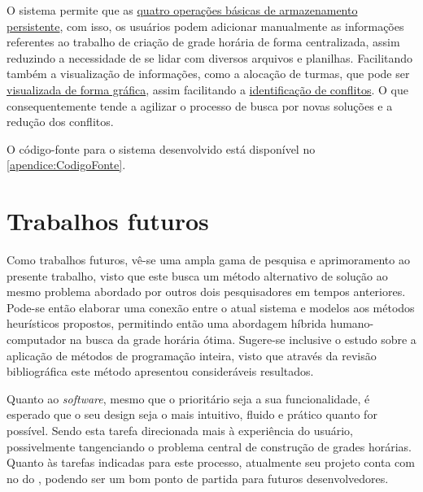 O sistema permite que as \hyperref[sssec:Funcionalidades Iniciais]{quatro operações básicas de armazenamento persistente}, com isso, os usuários podem adicionar manualmente as informações referentes ao trabalho de criação de grade horária de forma centralizada, assim reduzindo a necessidade de se lidar com diversos arquivos e planilhas. Facilitando também a visualização de informações, como a alocação de turmas, que pode ser \hyperref[fig:pagina_multiFiltros]{visualizada de forma gráfica}, assim facilitando a \hyperref[sec:conflitos]{identificação de conflitos}. O que consequentemente tende a agilizar o processo de busca por novas soluções e a redução dos conflitos.

O código-fonte para o sistema desenvolvido está disponível no \autoref{apendice:CodigoFonte}.

\section{Trabalhos futuros} %

Como trabalhos futuros, vê-se uma ampla gama de pesquisa e aprimoramento ao presente trabalho, visto que este busca um método alternativo de solução ao mesmo problema abordado por outros dois pesquisadores em tempos anteriores. Pode-se então elaborar uma conexão entre o atual sistema e modelos aos métodos heurísticos propostos, permitindo então uma abordagem híbrida humano-computador na busca da grade horária ótima. Sugere-se inclusive o estudo sobre a aplicação de métodos de programação inteira, visto que através da revisão bibliográfica este método apresentou consideráveis resultados.

Quanto ao \textit{software}, mesmo que o prioritário seja a sua funcionalidade, é esperado que o seu design seja o mais intuitivo, fluido e prático quanto for possível. Sendo esta tarefa direcionada mais à experiência do usuário, possivelmente tangenciando o problema central de construção de grades horárias. Quanto às tarefas indicadas para este processo, atualmente seu projeto conta com  no  do , podendo ser um bom ponto de partida para futuros desenvolvedores.


